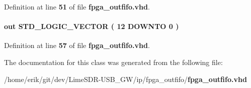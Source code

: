 Definition at line {\bf 51} of file {\bf fpga\+\_\+outfifo.\+vhd}.

\paragraph[{wrusedw}]{ {\bfseries \textcolor{keywordflow}{out}\textcolor{vhdlchar}{ }} {\bfseries \textcolor{comment}{S\+T\+D\+\_\+\+L\+O\+G\+I\+C\+\_\+\+V\+E\+C\+T\+OR}\textcolor{vhdlchar}{ }\textcolor{vhdlchar}{(}\textcolor{vhdlchar}{ }\textcolor{vhdlchar}{ } \textcolor{vhdldigit}{12} \textcolor{vhdlchar}{ }\textcolor{keywordflow}{D\+O\+W\+N\+TO}\textcolor{vhdlchar}{ }\textcolor{vhdlchar}{ } \textcolor{vhdldigit}{0} \textcolor{vhdlchar}{ }\textcolor{vhdlchar}{)}\textcolor{vhdlchar}{ }} \hspace{0.3cm}{\ttfamily [Port]}}\label{classfpga__outfifo_ac342c262e9d59ae21e4bed3f6d1fd043}


Definition at line {\bf 57} of file {\bf fpga\+\_\+outfifo.\+vhd}.



The documentation for this class was generated from the following file\+:\begin{DoxyCompactItemize}
\item 
/home/erik/git/dev/\+Lime\+S\+D\+R-\/\+U\+S\+B\+\_\+\+G\+W/ip/fpga\+\_\+outfifo/{\bf fpga\+\_\+outfifo.\+vhd}\end{DoxyCompactItemize}
